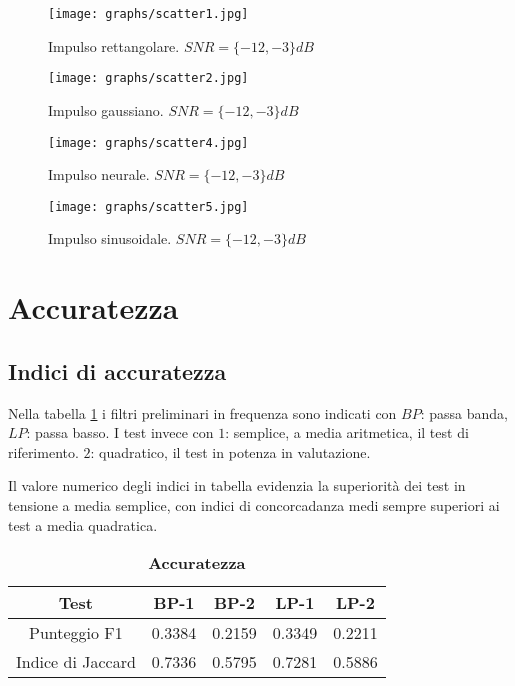 \documentclass[9pt,twocolumn,twoside]{osajnl}
\begin{document}
\begin{figure}[htbp]
\centering
\texttt{[image: graphs/scatter1.jpg]}
\caption{Impulso rettangolare. $SNR= \{-12,-3\}dB$}
\label{fig:scatter1}
\end{figure}

\begin{figure}[htbp]
\centering
\texttt{[image: graphs/scatter2.jpg]}
\caption{Impulso gaussiano. $SNR= \{-12,-3\}dB$}
\label{fig:scatter2}
\end{figure}

\begin{figure}[htbp]
\centering
\texttt{[image: graphs/scatter4.jpg]}
\caption{Impulso neurale. $SNR= \{-12,-3\}dB$}
\label{fig:scatter4}
\end{figure}

\begin{figure}[htbp]
\centering
\texttt{[image: graphs/scatter5.jpg]}
\caption{Impulso sinusoidale. $SNR= \{-12,-3\}dB$}
\label{fig:scatter5}
\end{figure}



\section{Accuratezza}
\label{accuratezza}


\subsection{Indici di accuratezza}
\label{indici}
Nella tabella \ref{tab:indici} i filtri preliminari in frequenza sono indicati con
$BP$: passa banda,
$LP$: passa basso.
I test invece con
$1$: semplice, a media aritmetica, il test di riferimento.
$2$: quadratico, il test in potenza in valutazione.

Il valore numerico degli indici in tabella evidenzia la superiorità dei test in tensione a media semplice, con indici di concorcadanza medi sempre superiori ai test a media quadratica.

\begin{table}[htbp]
\centering
\caption{\bf Accuratezza}
\begin{tabular}{ccccc}
\hline
Test                & BP-1 & BP-2 & LP-1 & LP-2 \\
\hline
Punteggio F1        & 0.3384    &0.2159    &0.3349    &0.2211\\
Indice di Jaccard   & 0.7336    &0.5795    &0.7281    &0.5886 \\
\hline
\end{tabular}
\label{tab:indici}
\end{table}
\end{document}
